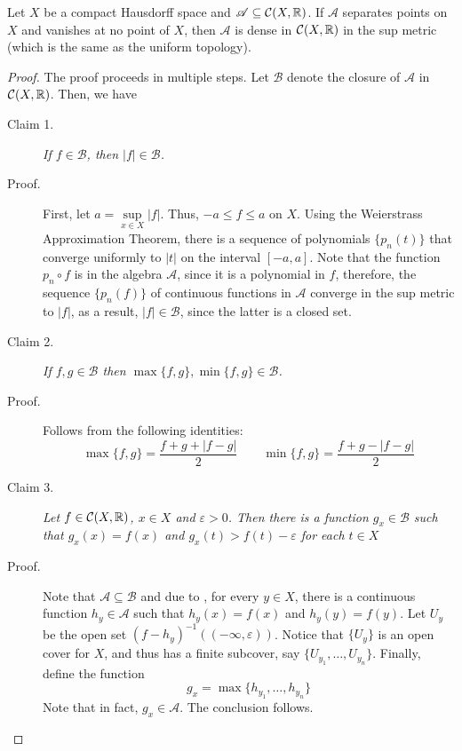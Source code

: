 \begin{theorem}
    Let $X$ be a compact Hausdorff space and $\mathscr A\subseteq\mathcal C(X,\mathbb{R})$. If $\mathscr A$ separates points on $X$ and vanishes at no point of $X$, then $\mathscr A$ is dense in $\mathcal C(X,\mathbb{R})$ in the sup metric (which is the same as the uniform topology).
\end{theorem}
\begin{proof}
The proof proceeds in multiple steps. Let $\mathscr B$ denote the closure of $\mathscr A$ in $\mathcal C(X,\mathbb{R})$. Then, we have 
\begin{description}
\item[Claim 1.] \itshape If $f\in\mathscr B$, then $|f|\in\mathscr B$.\normalfont
\item[Proof.] First, let $a = \sup\limits_{x\in X} |f|$. Thus, $-a\le f\le a$ on $X$. Using the Weierstrass Approximation Theorem, there is a sequence of polynomials $\{p_n(t)\}$ that converge uniformly to $|t|$ on the interval $[-a,a]$. Note that the function $p_n\circ f$ is in the algebra $\mathscr A$, since it is a polynomial in $f$, therefore, the sequence $\{p_n(f)\}$ of continuous functions in $\mathscr A$ converge in the sup metric to $|f|$, as a result, $|f|\in\mathscr B$, since the latter is a closed set.

\item[Claim 2.] \itshape If $f,g\in\mathscr B$ then $\max\{f,g\}, \min\{f,g\}\in\mathscr B$.\normalfont
\item[Proof.] Follows from the following identities: 
\begin{equation*}
    \max\{f,g\} = \frac{f + g + |f - g|}{2}\qquad\min\{f,g\} = \frac{f + g - |f - g|}{2}
\end{equation*}

\item[Claim 3.]\itshape Let $f\in\mathcal C(X,\mathbb{R})$, $x\in X$ and $\varepsilon > 0$. Then there is a function $g_x\in\mathscr B$ such that $g_x(x) = f(x)$ and $g_x(t) > f(t) - \varepsilon$ for each $t\in X$\normalfont
\item[Proof.] Note that $\mathscr A\subseteq\mathscr B$ and due to , for every $y\in X$, there is a continuous function $h_y\in\mathscr A$ such that $h_y(x) = f(x)$ and $h_y(y) = f(y)$. Let $U_y$ be the open set $(f - h_y)^{-1}((-\infty,\varepsilon))$. Notice that $\{U_y\}$ is an open cover for $X$, and thus has a finite subcover, say $\{U_{y_1},\ldots,U_{y_n}\}$. Finally, define the function 
\begin{equation*}
    g_x = \max\{h_{y_1},\ldots,h_{y_n}\}
\end{equation*}
Note that in fact, $g_x\in\mathscr A$. The conclusion follows. 


\end{description}
\end{proof}

